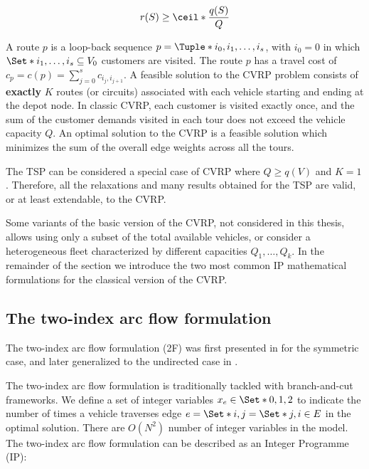 \begin{equation}
	r(S) \ge \ceil*{\frac{q(S)}{Q}}
\end{equation}

A route $p$ is a loop-back sequence $p = \Tuple*{i_0, i_1, \dots, i_s}$, with $i_0 = 0$ in which
$\Set*{i_1, \dots, i_s} \subseteq V_0$ customers are visited.
The route $p$ has a travel cost of $c_p = c(p) = \sum_{j=0}^s c_{i_j,i_{j+1}}$.
A feasible solution to the CVRP problem consists of \textbf{exactly} $K$ routes (or circuits)
associated with each vehicle starting and ending at the depot node.
In classic CVRP, each customer is visited exactly once, and the sum of the customer demands visited in each tour does not exceed the vehicle capacity $Q$.
An optimal solution to the CVRP is a feasible solution which minimizes the sum of the overall edge weights across all the tours.

\medskip

The TSP can be considered a special case of CVRP where $Q \ge q(V)$ and $K = 1$.
Therefore, all the relaxations and many results obtained for the TSP are valid, or at least extendable, to the CVRP.

\medskip

Some variants of the basic version of the CVRP, not considered in this thesis, allows using only a subset of the total available vehicles,
or consider a heterogeneous fleet characterized by different capacities $Q_1, \dots, Q_k$.
In the remainder of the section we introduce the two most common IP mathematical formulations for the classical version of the CVRP.

\subsection{The two-index arc flow formulation}
\label{sec:intro-cvrp-two-index-flow-formulation}

The two-index arc flow formulation (2F) was first presented in \cite{laporte1983, laporte1985} for the symmetric case,
and later generalized to the undirected case in \cite{laporte1986}.

The two-index arc flow formulation is traditionally tackled with branch-and-cut frameworks.
We define a set of integer variables $x_e \in \Set*{0, 1, 2}$ to indicate the number of times
a vehicle traverses edge $e = \Set*{i, j} = \Set*{j, i} \in E$ in the optimal solution.
There are $O(N^2)$ number of integer variables in the model.
The two-index arc flow formulation can be described as an Integer Programme (IP):

